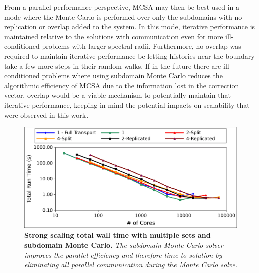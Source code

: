 From a parallel performance perspective, MCSA may then be best used in
a mode where the Monte Carlo is performed over only the subdomains
with no replication or overlap added to the system. In this mode,
iterative performance is maintained relative to the solutions with
communication even for more ill-conditioned problems with larger
spectral radii. Furthermore, no overlap was required to maintain
iterative performance be letting histories near the boundary take a
few more steps in their random walks. If in the future there are
ill-conditioned problems where using subdomain Monte Carlo reduces the
algorithmic efficiency of MCSA due to the information lost in the
correction vector, overlap would be a viable mechanism to potentially
maintain that iterative performance, keeping in mind the potential
impacts on scalability that were observed in this work.

\begin{figure}[t!]
  \begin{center}
    \includegraphics[width=6in]{chapters/parallel_mc/titan_strong_subdomain_ms_time.pdf}
  \end{center}
  \caption{\textbf{Strong scaling total wall time with multiple sets
      and subdomain Monte Carlo.} \textit{The subdomain Monte Carlo
      solver improves the parallel efficiency and therefore time to
      solution by eliminating all parallel communication during the
      Monte Carlo solve.}}
  \label{fig:titan_strong_subdomain_ms_time}
\end{figure}

